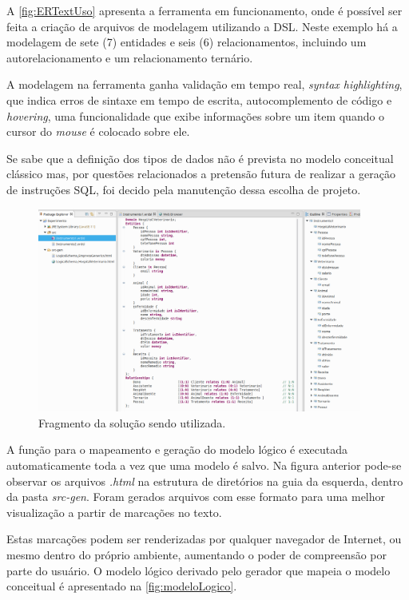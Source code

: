 A \autoref{fig:ERTextUso} apresenta a ferramenta em funcionamento, onde é possível ser feita a criação de arquivos de modelagem utilizando a \ac{DSL}. 
Neste exemplo há a modelagem de sete (7) entidades e seis (6) relacionamentos, incluindo um autorelacionamento e um relacionamento ternário.

A modelagem na ferramenta ganha validação em tempo real,  \textit{syntax highlighting}, que indica erros de sintaxe em tempo de escrita, autocomplemento de código e \textit{hovering}, uma funcionalidade que exibe informações sobre um item quando o cursor do \textit{mouse} é colocado sobre ele.

Se sabe que a definição dos tipos de dados não é prevista no modelo conceitual clássico mas, por questões relacionados a pretensão futura de realizar a geração de instruções \ac{SQL}, foi decido pela manutenção dessa escolha de projeto. 

\begin{figure}[!htb]
    \centering
    \caption{Fragmento da solução sendo utilizada.}
    \label{fig:ERTextUso}
    \includegraphics[width=0.95\textwidth]{img/ERTextUso}
\end{figure}

A função para o mapeamento e geração do modelo lógico é executada automaticamente toda a vez que uma modelo é salvo.
Na figura anterior pode-se observar os arquivos \textit{.html} na estrutura de diretórios na guia da esquerda, dentro da pasta \textit{src-gen}.
Foram gerados arquivos com esse formato para uma melhor visualização a partir de marcações no texto.

Estas marcações podem ser renderizadas por qualquer navegador de Internet, ou mesmo dentro do próprio ambiente, aumentando o poder de compreensão por parte do usuário.
O modelo lógico derivado pelo gerador que mapeia o modelo conceitual é apresentado na \autoref{fig:modeloLogico}.

